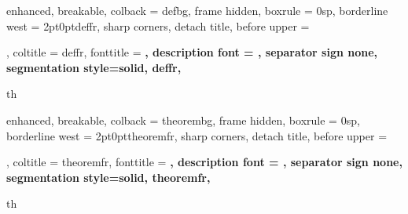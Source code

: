 \usepackage{array}

\newcommand\TODO{{\bfseries \color{red} \itshape \underline{Todo}}}


\usepackage{tikz}
\usepackage[most,many,breakable]{tcolorbox}

{%
	enhanced,
	breakable,
	colback = defbg,
	frame hidden,
	boxrule = 0sp,
	borderline west = {2pt}{0pt}{deffr},
	sharp corners,
	detach title,
	before upper = \tcbtitle\par\smallskip,
	coltitle = deffr,
	fonttitle = \bfseries\sffamily,
	description font = \mdseries,
	separator sign none,
	segmentation style={solid, deffr},
}
{th}


{%
	enhanced,
	breakable,
	colback = theorembg,
	frame hidden,
	boxrule = 0sp,
	borderline west = {2pt}{0pt}{theoremfr},
	sharp corners,
	detach title,
	before upper = \tcbtitle\par\smallskip,
	coltitle = theoremfr,
	fonttitle = \bfseries\sffamily,
	description font = \mdseries,
	separator sign none,
	segmentation style={solid, theoremfr},
}
{th}
